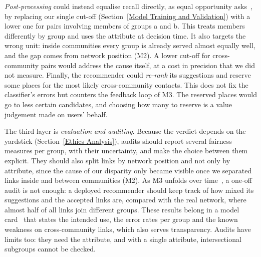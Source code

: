 \documentclass[runningheads]{llncs}
\begin{document}
\emph{Post-processing} could instead equalise recall directly, as equal opportunity asks~\cite{hardt2016}, by replacing our single cut-off (Section~\ref{Model Training and Validation}) with a lower one for pairs involving members of groups a and b. This treats members differently by group and uses the attribute at decision time. It also targets the wrong unit: inside communities every group is already served almost equally well, and the gap comes from network position (M2). A lower cut-off for cross-community pairs would address the cause itself, at a cost in precision that we did not measure. Finally, the recommender could \emph{re-rank} its suggestions and reserve some places for the most likely cross-community contacts. This does not fix the classifier's errors but counters the feedback loop of M3. The reserved places would go to less certain candidates, and choosing how many to reserve is a value judgement made on users' behalf.

The third layer is \emph{evaluation and auditing}. Because the verdict depends on the yardstick (Section~\ref{Ethics Analysis}), audits should report several fairness measures per group, with their uncertainty, and make the choice between them explicit. They should also split links by network position and not only by attribute, since the cause of our disparity only became visible once we separated links inside and between communities (M2). As M3 unfolds over time~\cite{chaney2018}, a one-off audit is not enough: a deployed recommender should keep track of how mixed its suggestions and the accepted links are, compared with the real network, where almost half of all links join different groups. These results belong in a model card~\cite{mitchell2019} that states the intended use, the error rates per group and the known weakness on cross-community links, which also serves transparency. Audits have limits too: they need the attribute, and with a single attribute, intersectional subgroups cannot be checked.
\end{document}
